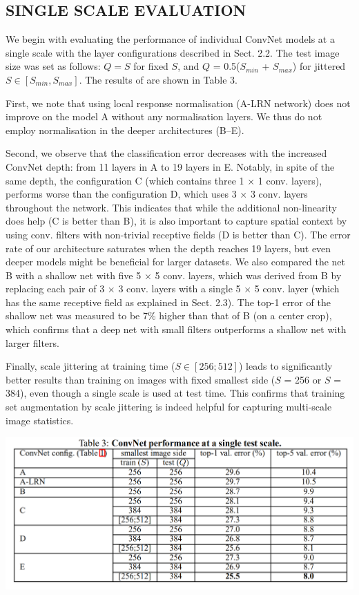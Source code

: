 \documentclass[12pt,a4paper,UTF8,twoside]{book}
\begin{document}
\hypertarget{single-scale-evaluation}{%
\subsection{SINGLE SCALE EVALUATION}\label{single-scale-evaluation}}

We begin with evaluating the performance of individual ConvNet models at a single scale with the layer configurations described in Sect. 2.2. The test image size was set as follows: \(Q = S\) for fixed \(S\), and \(Q\) = 0.5(\(S_{min}\) + \(S_{max}\)) for jittered \(S \in [S_{min}, S_{max}]\). The results of are shown in Table 3.

First, we note that using local response normalisation (A-LRN network) does not improve on the model A without any normalisation layers. We thus do not employ normalisation in the deeper architectures (B--E).

Second, we observe that the classification error decreases with the increased ConvNet depth: from 11 layers in A to 19 layers in E. Notably, in spite of the same depth, the configuration C (which contains three 1 × 1 conv. layers), performs worse than the configuration D, which uses 3 × 3 conv. layers throughout the network. This indicates that while the additional non-linearity does help (C is better than B), it is also important to capture spatial context by using conv. filters with non-trivial receptive fields (D is better than C). The error rate of our architecture saturates when the depth reaches 19 layers, but even deeper models might be beneficial for larger datasets. We also compared the net B with a shallow net with five 5 × 5 conv. layers, which was derived from B by replacing each pair of 3 × 3 conv. layers with a single 5 × 5 conv. layer (which has the same receptive field as explained in Sect. 2.3). The top-1 error of the shallow net was measured to be 7\% higher than that of B (on a center crop), which confirms that a deep net with small filters outperforms a shallow net with larger filters.

Finally, scale jittering at training time (\(S \in [256; 512]\)) leads to significantly better results than training on images with fixed smallest side (\(S\) = 256 or \(S\) = 384), even though a single scale is used at test time. This confirms that training set augmentation by scale jittering is indeed helpful for capturing multi-scale image statistics.

\begin{center}\includegraphics[width=0.7\linewidth]{img/03-03} \end{center}
\end{document}
